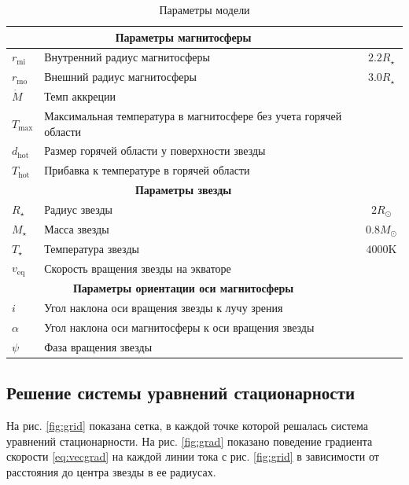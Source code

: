 \documentclass{article}
\begin{document}
\begin{table}[hb]
\centering
\begin{tabular}[c]{|l l c|}
	\multicolumn{2}{c}{\textbf{Параметры магнитосферы}} \\
	\hline
	$r_\text{mi}$ & Внутренний радиус магнитосферы & $2.2 R_\star$\\
	\hline
	$r_\text{mo}$ & Внешний радиус магнитосферы & $3.0 R_\star$\\
	\hline
	$\dot{M}$ & Темп аккреции & \\
	\hline
	$T_\text{max}$ & Максимальная температура в магнитосфере без учета горячей области & \\
	\hline
	$d_\text{hot}$ & Размер горячей области у поверхности звезды & \\
	\hline
	$T_\text{hot}$ & Прибавка к температуре в горячей области & \\
	\hline
	\multicolumn{2}{c}{\textbf{Параметры звезды}} \\
	\hline
	$R_\star $ & Радиус звезды & $2 R_\odot$ \\
	\hline
	$M_\star $ & Масса звезды & $0.8 M_\odot$ \\
	\hline
	$T_\star $ & Температура звезды & $4000\text{K} $ \\
	\hline
	$v_\text{eq}$ & Скорость вращения звезды на экваторе & \\
	\hline
	\multicolumn{2}{c}{\textbf{Параметры ориентации оси магнитосферы}} \\
	\hline
	$i$ & Угол наклона оси вращения звезды к лучу зрения & \\
	\hline
	$\alpha$ & Угол наклона оси магнитосферы к оси вращения звезды & \\
	\hline
	$\psi$ & Фаза вращения звезды & \\
	\hline
\end{tabular}
\caption{Параметры модели}
\label{tab:par}
\end{table}

\subsection{Решение системы уравнений стационарности}

На рис. \ref{fig:grid} показана сетка, в каждой точке которой решалась система уравнений стационарности. На рис. \ref{fig:grad} показано поведение градиента скорости \eqref{eq:vecgrad} на каждой линии тока с рис. \ref{fig:grid} в зависимости от расстояния до центра звезды в ее радиусах.
\end{document}
